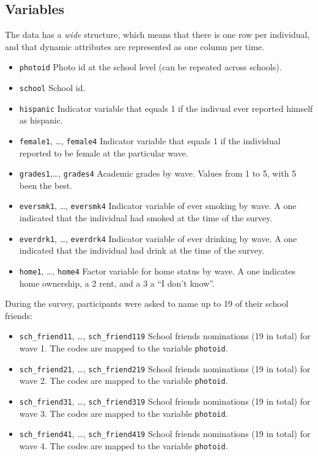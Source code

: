 \documentclass[]{book}
\theoremstyle{definition}
\theoremstyle{definition}
\theoremstyle{definition}
\theoremstyle{remark}
\begin{document}
\subsection{Variables}\label{variables}

The data has a \emph{wide} structure, which means that there is one row
per individual, and that dynamic attributes are represented as one
column per time.

\begin{itemize}
\item
  \texttt{photoid} Photo id at the school level (can be repeated across
  schools).
\item
  \texttt{school} School id.
\item
  \texttt{hispanic} Indicator variable that equals 1 if the indivual
  ever reported himself as hispanic.
\item
  \texttt{female1}, \ldots{}, \texttt{female4} Indicator variable that
  equals 1 if the individual reported to be female at the particular
  wave.
\item
  \texttt{grades1},\ldots{}, \texttt{grades4} Academic grades by wave.
  Values from 1 to 5, with 5 been the best.
\item
  \texttt{eversmk1}, \ldots{}, \texttt{eversmk4} Indicator variable of
  ever smoking by wave. A one indicated that the individual had smoked
  at the time of the survey.
\item
  \texttt{everdrk1}, \ldots{}, \texttt{everdrk4} Indicator variable of
  ever drinking by wave. A one indicated that the individual had drink
  at the time of the survey.
\item
  \texttt{home1}, \ldots{}, \texttt{home4} Factor variable for home
  status by wave. A one indicates home ownership, a 2 rent, and a 3 a
  ``I don't know''.
\end{itemize}

During the survey, participants were asked to name up to 19 of their
school friends:

\begin{itemize}
\item
  \texttt{sch\_friend11}, \ldots{}, \texttt{sch\_friend119} School
  friends nominations (19 in total) for wave 1. The codes are mapped to
  the variable \texttt{photoid}.
\item
  \texttt{sch\_friend21}, \ldots{}, \texttt{sch\_friend219} School
  friends nominations (19 in total) for wave 2. The codes are mapped to
  the variable \texttt{photoid}.
\item
  \texttt{sch\_friend31}, \ldots{}, \texttt{sch\_friend319} School
  friends nominations (19 in total) for wave 3. The codes are mapped to
  the variable \texttt{photoid}.
\item
  \texttt{sch\_friend41}, \ldots{}, \texttt{sch\_friend419} School
  friends nominations (19 in total) for wave 4. The codes are mapped to
  the variable \texttt{photoid}.
\end{itemize}
\end{document}
